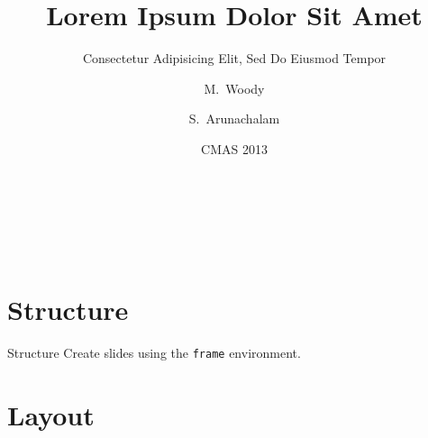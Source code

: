 \documentclass{beamer}	%
\title[Lorem Ipsum] %
{Lorem Ipsum Dolor Sit Amet}	%
\subtitle
{Consectetur Adipisicing Elit, Sed Do Eiusmod Tempor} %
\author[Woody, Arunachalam] %
{M.~Woody\inst{1,2} \and S.~Arunachalam\inst{1}}
\institute[UNC-CH] 				%
{
  \inst{1}%
  Center for Environmental Modeling for Policy Development\\
  Institute for the Environment\\
  University of North Carolina at Chapel Hill
  \and
  \inst{2}%
  Department of Environmental Sciences and Engineering\\
  University of North Carolina at Chapel Hill
}
\date[\today]				%
{CMAS 2013}						%
\begin{document}
\begin{frame}{~}						%
\titlepage
\end{frame}

\begin{frame}{~}
  \tableofcontents						%
\end{frame}

\section{Structure}
\begin{frame}{Structure}
	Create slides using the \texttt{frame} environment.
\end{frame}


\section{Layout}
\end{document}

